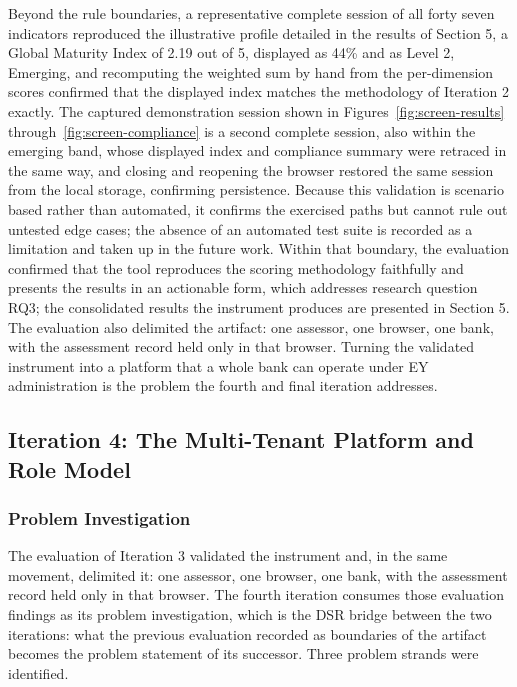 Beyond the rule boundaries, a representative complete session of all forty seven indicators reproduced the illustrative profile detailed in the results of Section 5, a Global Maturity Index of 2.19 out of 5, displayed as 44\% and as Level 2, Emerging, and recomputing the weighted sum by hand from the per-dimension scores confirmed that the displayed index matches the methodology of Iteration 2 exactly. The captured demonstration session shown in Figures~\ref{fig:screen-results} through~\ref{fig:screen-compliance} is a second complete session, also within the emerging band, whose displayed index and compliance summary were retraced in the same way, and closing and reopening the browser restored the same session from the local storage, confirming persistence. Because this validation is scenario based rather than automated, it confirms the exercised paths but cannot rule out untested edge cases; the absence of an automated test suite is recorded as a limitation and taken up in the future work. Within that boundary, the evaluation confirmed that the tool reproduces the scoring methodology faithfully and presents the results in an actionable form, which addresses research question RQ3; the consolidated results the instrument produces are presented in Section 5. The evaluation also delimited the artifact: one assessor, one browser, one bank, with the assessment record held only in that browser. Turning the validated instrument into a platform that a whole bank can operate under EY administration is the problem the fourth and final iteration addresses.

\subsection{Iteration 4: The Multi-Tenant Platform and Role Model}

\subsubsection{Problem Investigation}

The evaluation of Iteration 3 validated the instrument and, in the same movement, delimited it: one assessor, one browser, one bank, with the assessment record held only in that browser. The fourth iteration consumes those evaluation findings as its problem investigation, which is the DSR bridge between the two iterations: what the previous evaluation recorded as boundaries of the artifact becomes the problem statement of its successor. Three problem strands were identified.

